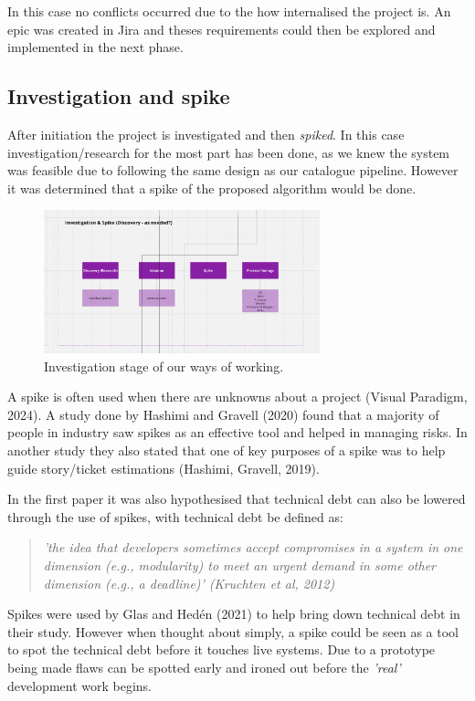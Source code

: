   In this case no conflicts occurred due to the how internalised the project is. An epic was created in Jira and theses requirements could then be explored 
  and implemented in the next phase.

  \newpage
  \subsection{Investigation and spike}
  After initiation the project is investigated and then \textit{spiked}. In this case investigation/research for the most part has been done,
  as we knew the system was feasible due to following the same design as our catalogue pipeline. However it was determined that a spike of the 
  proposed algorithm would be done.

  \begin{figure}[H]
    \centering
    \includegraphics[width=8cm]{assets/workflow/investigation.png}
    \caption{Investigation stage of our ways of working.}
    \label{fig:workflowInvestigation}
  \end{figure}
  
  A spike is often used when there are unknowns about a  project (Visual Paradigm, 2024). A study done by 
  Hashimi and Gravell (2020) found that a majority of people in industry saw spikes as an effective tool and helped in managing risks. In another
  study they also stated that one of key purposes of a spike was to help guide story/ticket estimations (Hashimi, Gravell, 2019). 
  
  In the first paper it was also hypothesised that technical debt can also be lowered through the use of spikes, with technical debt be defined as:
  \begin{quote}
    \textit{'the idea that developers sometimes accept
    compromises in a system in one dimension (e.g., modularity) to meet an
    urgent demand in some other dimension (e.g., a deadline)' (Kruchten et al, 2012)}
  \end{quote}

  Spikes were used by Glas and Hedén (2021) to help bring down technical debt in their study. However when thought about simply, 
  a spike could be seen as a tool to spot the technical debt before it touches live systems. Due to a prototype being made flaws can be spotted 
  early and ironed out before the \textit{'real'} development work begins.

